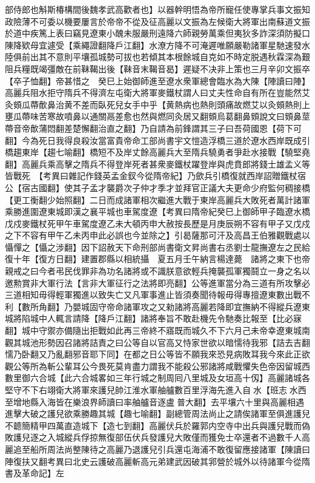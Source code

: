 部侍郎也斛斯椿構間後魏孝武高歡者也】以器幹明悟為帝所寵任使專掌兵事文振知政險薄不可委以機要屢言於帝帝不從及征高麗以文振為左候衛大將軍出南蘇道文振於道中疾篤上表曰竊見遼東小醜未服嚴刑遠降六師親勞萬乘但夷狄多詐深須防擬口陳降欵母宜遽受【乘繩證翻降戶江翻】水潦方降不可淹遲唯願嚴勒諸軍星馳速發水陸俱前出其不意則平壤孤城勢可拔也若傾其本根餘城自克如不時定脱遇秋霖深為艱阻兵糧既竭彊敵在前靺鞨出後【靺音末鞨音曷】遲疑不决非上策也三月辛卯文振卒【卒子恤翻】帝甚惜之　癸巳上始御師進至遼水衆軍總會臨水為大陳【陣讀曰陣】高麗兵阻水拒守隋兵不得濟左屯衛大將軍麥鐵杖謂人曰丈夫性命自有所在豈能然艾灸頞瓜蔕歕鼻治黄不差而臥死兒女手中乎【黄熱病也熱則頭痛故燃艾以灸頞熱則上壅瓜蔕味苦寒故噴鼻以通關鬲差愈也然與燃同灸居又翻頞烏葛翻鼻頞說文曰頞鼻莖蔕音帝歕蒲悶翻差楚懈翻治直之翻】乃自請為前鋒謂其三子曰吾荷國恩【荷下可翻】今為死日我得良殺汝當富貴帝命工部尚書宇文愷造浮橋三道於遼水西岸既成引橋趨東岸【趨七喻翻】橋短不及岸丈餘高麗兵大至隋兵驍勇者爭赴水接戰【驍堅堯翻】高麗兵乘高擊之隋兵不得登岸死者甚衆麥鐵杖躍登岸與虎賁郎將錢士雄孟义等皆戰死　【考異曰雜記作錢英孟金釵今從隋帝紀】乃歛兵引橋復就西岸詔贈鐵杖宿公【宿古國翻】使其子孟才襲爵次子仲才季才並拜官正議大夫更命少府監何稠接橋【更工衡翻少始照翻】二日而成諸軍相次繼進大戰于東岸高麗兵大敗死者萬計諸軍乘勝進圍遼東城即漢之襄平城也車駕度遼【考異曰隋帝紀癸巳上御師甲子臨遼水橋戊戍麥鐵杖死甲午車駕度遼乙未大頓丙申大赦按長歷是月庚辰朔不容有甲子又戊戍之下不容有甲午乙未丙申此必誤也今並除之】引曷薩那可汗及高昌王伯雅觀戰處以懾憚之【懾之涉翻】因下詔赦天下命刑部尚書衛文昇尚書右丞劉士龍撫遼左之民給復十年【復方日翻】建置郡縣以相統攝　夏五月壬午納言楊達薨　諸將之東下也帝親戒之曰今者弔民伐罪非為功名諸將或不識朕意欲輕兵掩襲孤軍獨鬪立一身之名以邀勲賞非大軍行法【言非大軍征行之法將即亮翻】公等進軍當分為三道有所攻擊必三道相知毋得輕軍獨進以致失亡又凡軍事進止皆須奏聞待報毋得專擅遼東數出戰不利【數所角翻】乃嬰城固守帝命諸軍攻之又勑諸將高麗若降即宜撫納不得縱兵遼東城將陷城中人輒言請降【降戶江翻】諸將奉旨不敢赴機先令馳奏比報至【比必寐翻】城中守禦亦備隨出拒戰如此再三帝終不寤既而城久不下六月己未帝幸遼東城南觀其城池形勢因召諸將詰責之曰公等自以官高又恃家世欲以暗懦待我邪【詰去吉翻懦乃卧翻又乃亂翻邪音耶下同】在都之日公等皆不願我來恐見病敗耳我今來此正欲觀公等所為斬公輩耳公今畏死莫肯盡力謂我不能殺公邪諸將咸戰懼失色帝因留城西數里御六合城【此六合城畧如三年行城之制周囘八里城及女垣高十仭】高麗諸城各堅守不下右翊衛大將軍來護兒帥江淮水軍舳艫數百里浮海先進入自水【班志水西至增地縣入海皆在樂浪界師讀曰率舳艫音逐盧普大翻】去平壤六十里與高麗相遇進擊大破之護兒欲乘勝趣其城【趣七喻翻】副總管周法尚止之請俟諸軍至俱進護兒不聼簡精甲四萬直造城下【造七到翻】高麗伏兵於羅郭内空寺中出兵與護兒戰而偽敗護兒逐之入城縱兵俘掠無復部伍伏兵發護兒大敗僅而獲免士卒還者不過數千人高麗追至船所周法尚整陳待之高麗乃退護兒引兵還屯海浦不敢復留應接諸軍【陳讀曰陣復扶又翻考異曰北史云護破高麗斬高元弟建武因破其郛營於城外以待諸軍今從隋書及革命記】左